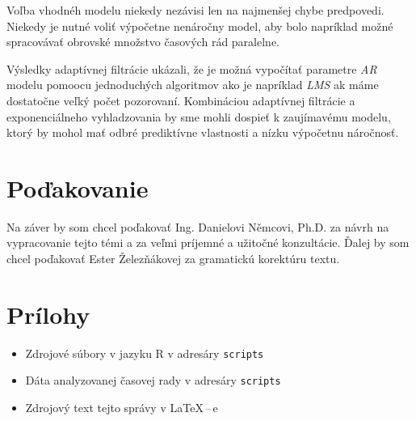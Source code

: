 \documentclass[12pt,a4paper,oneside,final]{article}
\theoremstyle{definition}
\theoremstyle{remark}
\numberwithin{equation}{section}
\begin{document}
Voľba vhodnéh modelu niekedy nezávisi len na najmenšej chybe predpovedi. Niekedy je nutné
voliť výpočetne nenáročny model, aby bolo napríklad možné spracovávať obrovské množstvo 
časových rád paralelne.

Výsledky adaptívnej filtrácie ukázali, že je možná vypočítať parametre \emph{AR} modelu
pomoocu jednoduchých algoritmov ako je napríklad \emph{LMS} ak máme dostatočne veľký počet
pozorovaní. Kombináciou adaptívnej filtrácie a exponenciálneho vyhladzovania by sme mohli 
dospieť k zaujímavému modelu, ktorý by mohol mať odbré prediktívne vlastnosti a nízku
výpočetnu náročnosť.

\section*{Poďakovanie}
Na záver by som chcel poďakovať Ing. Danielovi Němcovi, Ph.D. za návrh na vypracovanie
tejto témi a za veľmi príjemné a užitočné konzultácie. Ďalej by som chcel poďakovať Ester
Železňákovej za gramatickú korektúru textu.




\newpage
\renewcommand{\thesection}{\Alph{section}}
\setcounter{section}{0}
\renewcommand{\thepage}{\roman{page}}
\setcounter{page}{1}

\section{Prílohy}

\begin{itemize}
    \item Zdrojové súbory v jazyku R v adresáry \texttt{scripts}
    \item Dáta analyzovanej časovej rady v adresáry \texttt{scripts}
    \item Zdrojový text tejto správy v \LaTeX\,--\,e
\end{itemize}
\end{document}
